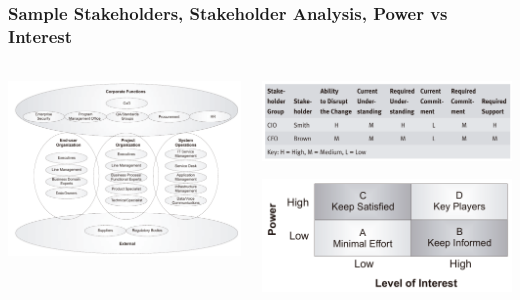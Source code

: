 \documentclass[aspectratio=169, table]{beamer}
\begin{document}
    {
        \begin{frame}
            \frametitle{Sample Stakeholders, Stakeholder Analysis, Power vs Interest}
            \framesubtitle{\hspace{1cm}}
            \begin{columns}
                \begin{column}{0.5\textwidth}
                    \begin{center}
                        \includegraphics[width=\textwidth]{../figures/sample_stakeholders}
                    \end{center}
                \end{column}
                \begin{column}{0.5\textwidth}
                    \begin{center}
                        \includegraphics[width=\textwidth]{../figures/stakeholder_analysis}
                    \end{center}
                    \begin{center}
                        \includegraphics[width=\textwidth]{../figures/power_vs_interest}

\end{center}
\end{column}
\end{columns}
\end{frame}}
\end{document}
